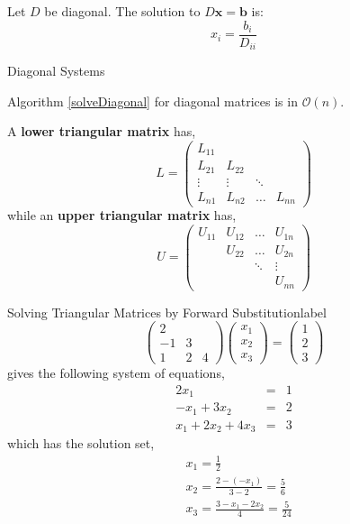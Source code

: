 \begin{rmk}
	Let $D$ be diagonal. The solution to $D \mathbf{x} = \mathbf{b}$ is:
	\[x_i = \frac{b_i}{D_{ii}}\]
\end{rmk}

\begin{algorithm}
	  \caption{Diagonal Systems}\label{solveDiagonal}
\end{algorithm}

\begin{rmk}
	Algorithm \ref{solveDiagonal} for diagonal matrices is in $\mathcal{O}(n)$.
\end{rmk}

\begin{defn}
		A \textbf{lower triangular matrix} has,
		\[L=\left(\begin{array}{cccc}
		L_{11} & & & \\
		L_{21} & L_{22} & & \\
		\vdots & \vdots & \ddots & \\
		L_{n 1} & L_{n 2} & \ldots & L_{n n}
		\end{array}\right)\]
		while an \textbf{upper triangular matrix} has,
		\[U=\left(\begin{array}{cccc}
		U_{11} & U_{12} & \ldots & U_{1 n} \\
		& U_{22} & \ldots & U_{2 n} \\
		& & \ddots & \vdots \\
		& & & U_{n n}
		\end{array}\right)\]
\end{defn}

\begin{ex}{Solving Triangular Matrices by Forward Substitution}{label}
	\[\left(\begin{array}{ccc}
		2 & & \\
		-1 & 3 & \\
		1 & 2 & 4
		\end{array}\right)\left(\begin{array}{l}
		x_1 \\
		x_2 \\
		x_3
		\end{array}\right)=\left(\begin{array}{l}
		1 \\
		2 \\
		3
		\end{array}\right)\]
gives the following system of equations,
\[\begin{array}{rcr}
2 x_1 & = & 1 \\
-x_1+3 x_2 & = & 2 \\
x_1+2 x_2+4 x_3 & = & 3\end{array}\]
which has the solution set,
\begin{align*}
	&x_1=\frac{1}{2} \\
	&x_2=\frac{2-\left(-x_1\right)}{3-2}=\frac{5}{6} \\
	&x_3=\frac{3-x_1-2 x_2}{4}=\frac{5}{24}
\end{align*}
\end{ex}

